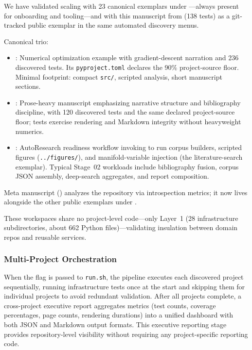 \documentclass[
  english,
]{article}
\providecommand{\tightlist}{%
  \setlength{\itemsep}{0pt}\setlength{\parskip}{0pt}}
\begin{document}
We have validated scaling with 23 canonical exemplars under
---always present for onboarding and
tooling---and with this manuscript from
 (138 tests) as a
git-tracked public exemplar in the same automated discovery menus.

Canonical trio:

\begin{itemize}
\tightlist
\item
  \textbf{}: Numerical optimization
  example with gradient-descent narration and 236 discovered tests. Its
  \texttt{pyproject.toml} declares the 90\% project-source floor.
  Minimal footprint: compact \texttt{src/}, scripted analysis, short
  manuscript sections.
\item
  \textbf{}: Prose-heavy manuscript
  emphasizing narrative structure and bibliography discipline, with 120
  discovered tests and the same declared project-source floor; tests
  exercise rendering and Markdown integrity without heavyweight
  numerics.
\item
  \textbf{}: AutoResearch
  readiness workflow invoking
   to run
  corpus builders, scripted figures (\texttt{../figures/}), and
  manifold-variable injection (the literature-search exemplar). Typical
  Stage~02 workloads include bibliography fusion, corpus JSON assembly,
  deep-search aggregates, and report composition.
\end{itemize}

Meta manuscript
(\textbf{}) analyzes the
repository via  introspection metrics;
it now lives alongside the other public exemplars under
.

These workspaces share no project-level code---only Layer~1 (28
infrastructure subdirectories, about 662 Python
files)---validating insulation between domain repos and reusable
services.

\subsubsection{Multi-Project
Orchestration}\label{multi-project-orchestration}

When the  flag is passed to \texttt{run.sh},
the pipeline executes each discovered project sequentially, running
infrastructure tests once at the start and skipping them for individual
projects to avoid redundant validation. After all projects complete, a
cross-project executive report aggregates metrics (test counts, coverage
percentages, page counts, rendering durations) into a unified dashboard
with both JSON and Markdown output formats. This executive reporting
stage provides repository-level visibility without requiring any
project-specific reporting code.
\end{document}
